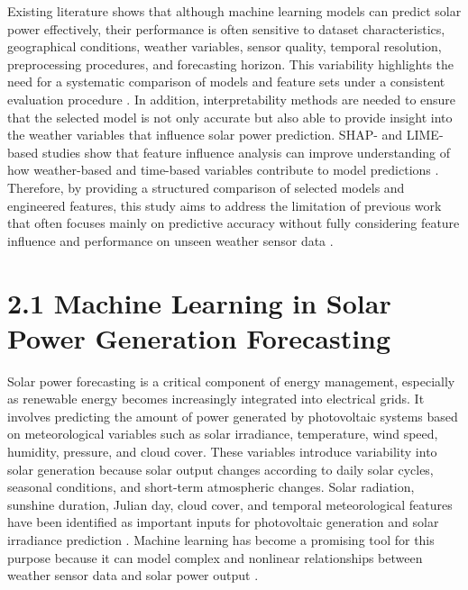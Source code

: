 Existing literature shows that although machine learning models can predict solar power effectively, their performance is often sensitive to dataset characteristics, geographical conditions, weather variables, sensor quality, temporal resolution, preprocessing procedures, and forecasting horizon. This variability highlights the need for a systematic comparison of models and feature sets under a consistent evaluation procedure \parencite{ArellanosTafur2025, Alhassan2025, CarvalhoJunior2025}. In addition, interpretability methods are needed to ensure that the selected model is not only accurate but also able to provide insight into the weather variables that influence solar power prediction. SHAP- and LIME-based studies show that feature influence analysis can improve understanding of how weather-based and time-based variables contribute to model predictions \parencite{JnanaVarshitha2025, TsaiLo2025, Duvuru2026}. Therefore, by providing a structured comparison of selected models and engineered features, this study aims to address the limitation of previous work that often focuses mainly on predictive accuracy without fully considering feature influence and performance on unseen weather sensor data \parencite{Eren2025, Ma2025}.

\section{2.1 Machine Learning in Solar Power Generation Forecasting}

Solar power forecasting is a critical component of energy management, especially as renewable energy becomes increasingly integrated into electrical grids. It involves predicting the amount of power generated by photovoltaic systems based on meteorological variables such as solar irradiance, temperature, wind speed, humidity, pressure, and cloud cover. These variables introduce variability into solar generation because solar output changes according to daily solar cycles, seasonal conditions, and short-term atmospheric changes. Solar radiation, sunshine duration, Julian day, cloud cover, and temporal meteorological features have been identified as important inputs for photovoltaic generation and solar irradiance prediction \parencite{CarvalhoJunior2025, Pongphaw2025, TsaiLo2025}. Machine learning has become a promising tool for this purpose because it can model complex and nonlinear relationships between weather sensor data and solar power output \parencite{Eren2025, JnanaVarshitha2025, Alhassan2025}.

